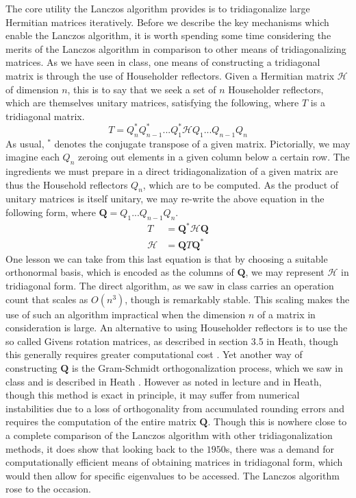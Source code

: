 \documentclass[12pt]{article} %
\begin{document}
The core utility the Lanczos algorithm provides is to tridiagonalize large Hermitian matrices iteratively. Before we describe the key mechanisms which enable the Lanczos algorithm, it is worth spending some time considering the merits of the Lanczos algorithm in comparison to other means of tridiagonalizing matrices. As we have seen in class, one means of constructing a tridiagonal matrix is through the use of Householder reflectors. Given a Hermitian matrix $\mathcal{H}$ of dimension $n$, this is to say that we seek a set of $n$ Householder reflectors, which are themselves unitary matrices, satisfying the following, where $T$ is a tridiagonal matrix. 
\begin{equation}
    T = Q^*_n Q^*_{n-1}...Q^*_1 \mathcal{H} Q_1 ... Q_{n-1}Q_n 
\end{equation}
As usual, $^*$ denotes the conjugate transpose of a given matrix.
Pictorially, we may imagine each $Q_n$ zeroing out elements in a given column below a certain row. The ingredients we must prepare in a direct tridiagonalization of a given matrix are thus the Household reflectors $Q_n$, which are to be computed. As the product of unitary matrices is itself unitary, we may re-write the above equation in the following form, where $\textbf{Q} = Q_1 ...  Q_{n-1}Q_n$.
\begin{equation}
    \begin{aligned}
        T &= \textbf{Q}^* \mathcal{H} \textbf{Q}\\
        \mathcal{H} &= \textbf{Q} T \textbf{Q}^*
    \end{aligned}
\end{equation}
One lesson we can take from this last equation is that by choosing a suitable orthonormal basis, which is encoded as the columns of $\textbf{Q}$, we may represent $\mathcal{H}$ in tridiagonal form. The direct algorithm, as we saw in class carries an operation count that scales as $O(n^3)$, though is remarkably stable. This scaling makes the use of such an algorithm impractical when the dimension $n$ of a matrix in consideration is large. An alternative to using Householder reflectors is to use the so called Givens rotation matrices, as described in section 3.5 in Heath, though this generally requires greater computational cost \cite{doi:10.1137/1.9781611975581}. Yet another way of constructing $\textbf{Q}$ is the Gram-Schmidt orthogonalization process, which we saw in class and is described in Heath \cite{doi:10.1137/1.9781611975581}. However as noted in lecture and in Heath, though this method is exact in principle, it may suffer from numerical instabilities due to a loss of orthogonality from accumulated rounding errors and requires the computation of the entire matrix $\textbf{Q}$.   Though this is nowhere close to a complete comparison of the Lanczos algorithm with other tridiagonalization methods, it does show that looking back to the $1950$s, there was a demand for computationally efficient means of obtaining matrices in tridiagonal form, which would then allow for specific eigenvalues to be accessed. The Lanczos algorithm rose to the occasion. 
\end{document}
